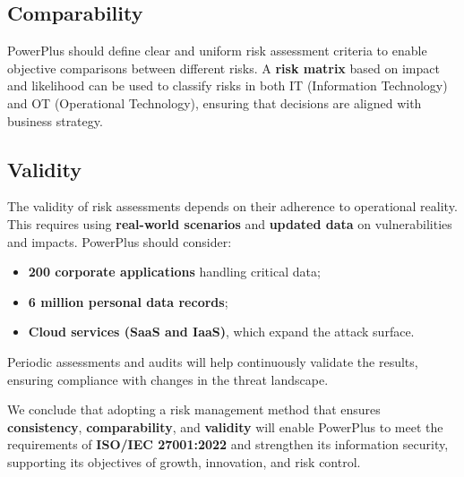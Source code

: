 \subsection{ Comparability}

PowerPlus should define clear and uniform risk assessment criteria to enable objective comparisons between different risks.  
A \textbf{risk matrix} based on impact and likelihood can be used to classify risks in both IT (Information Technology) and OT (Operational Technology), ensuring that decisions are aligned with business strategy.

\subsection{ Validity}

The validity of risk assessments depends on their adherence to operational reality. This requires using \textbf{real-world scenarios} and \textbf{updated data} on vulnerabilities and impacts.  
PowerPlus should consider:
\begin{itemize}
    \item \textbf{200 corporate applications} handling critical data;
    \item \textbf{6 million personal data records};
    \item \textbf{Cloud services (SaaS and IaaS)}, which expand the attack surface.
\end{itemize}
Periodic assessments and audits will help continuously validate the results, ensuring compliance with changes in the threat landscape.

\vspace{.7cm}
We conclude that adopting a risk management method that ensures \textbf{consistency}, \textbf{comparability}, and \textbf{validity} will enable PowerPlus to meet the requirements of \textbf{ISO/IEC 27001:2022} and strengthen its information security, supporting its objectives of growth, innovation, and risk control.


